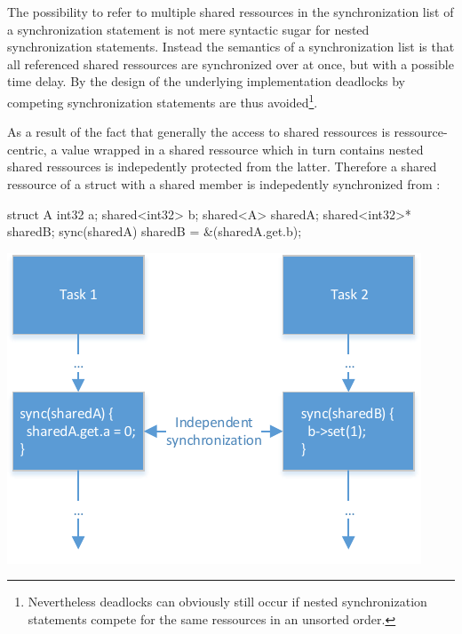 The possibility to refer to multiple shared ressources in the synchronization list of a synchronization statement is not mere syntactic sugar for nested synchronization statements. Instead the semantics of a synchronization list is that all referenced shared ressources are synchronized over at once, but with a possible time delay. By the design of the underlying implementation deadlocks by competing synchronization statements are thus avoided\footnote{Nevertheless deadlocks can obviously still occur if nested synchronization statements compete for the same ressources in an unsorted order.}.

As a result of the fact that generally the access to shared ressources is ressource-centric, a value wrapped in a shared ressource which in turn contains nested shared ressources is indepedently protected from the latter. Therefore a shared ressource of a struct with a shared member  is indepedently synchronized from :

\vspace{0.5cm}
\begin{minipage}{0.35\textwidth}
\begin{ccode}
struct A {
  int32 a;
  shared<int32> b; 
}
shared<A> sharedA;
shared<int32>* sharedB;
sync(sharedA) { sharedB = &(sharedA.get.b); }
\end{ccode}
\end{minipage}
\begin{minipage}{0.2\textwidth}
\begin{center}
\end{center}
\end{minipage}
\begin{minipage}{0.35\textwidth}
\includegraphics[scale=.9]{pics/ParallelExecution}
\end{minipage}

